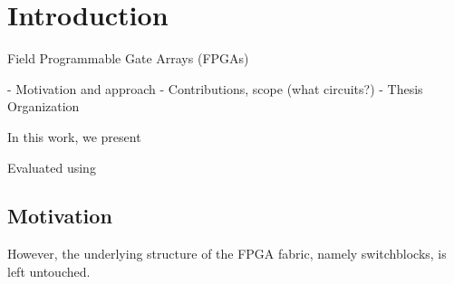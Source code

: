
\chapter{Introduction}
\label{ch:Introduction}


Field Programmable Gate Arrays (FPGAs) 

- Motivation and approach
- Contributions, scope (what circuits?)
- Thesis Organization

In this work, we present 

Evaluated using

\section{Motivation}
However, the underlying structure of the FPGA fabric, namely switchblocks, is left untouched. 

\endinput

Any text after an \endinput is ignored.
You could put scraps here or things in progress.
